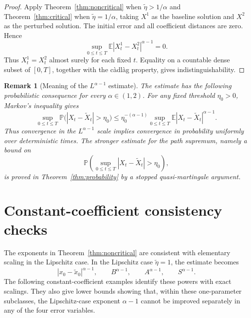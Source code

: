 \documentclass[10pt,a4paper]{amsart}
\newtheorem{remark}[theorem]{Remark}
\newcommand{\E}{\mathbb{E}}
\newcommand{\1}{\mathbf{1}}
\newcommand{\wt}{\tilde}
\begin{document}
\begin{proof}
Apply Theorem~\ref{thm:noncritical} when $\wt\eta>1/\alpha$ and Theorem~\ref{thm:critical} when $\wt\eta=1/\alpha$, taking $X^1$ as the baseline solution and $X^2$ as the perturbed solution. The initial error and all coefficient distances are zero. Hence
\[
  \sup_{0\le t\le T}\E|X_t^1-X_t^2|^{\alpha-1}=0.
\]
Thus $X_t^1=X_t^2$ almost surely for each fixed $t$. Equality on a countable dense subset of $[0,T]$, together with the c\`adl\`ag property, gives indistinguishability.
\end{proof}

\begin{remark}[Meaning of the $L^{\alpha-1}$ estimate]
The estimate has the following probabilistic consequence for every $\alpha\in(1,2)$. For any fixed threshold $\eta_0>0$, Markov's inequality gives
\[
  \sup_{0\le t\le T}\mathbb P\bigl(|X_t-\wt X_t|>\eta_0\bigr)
  \le \eta_0^{-(\alpha-1)}
  \sup_{0\le t\le T}\E|X_t-\wt X_t|^{\alpha-1}.
\]
Thus convergence in the $L^{\alpha-1}$ scale implies convergence in probability uniformly over deterministic times. The stronger estimate for the path supremum, namely a bound on
\[
  \mathbb P\left(\sup_{0\le t\le T}|X_t-\wt X_t|>\eta_0\right),
\]
is proved in Theorem~\ref{thm:probability} by a stopped quasi-martingale argument.
\end{remark}


\section{Constant-coefficient consistency checks}
\label{sec:consistency}

The exponents in Theorem~\ref{thm:noncritical} are consistent with elementary scaling in the Lipschitz case. In the Lipschitz case $\wt\eta=1$, the estimate becomes
\[
  |x_0-\wt x_0|^{\alpha-1},\qquad
  B^{\alpha-1},\qquad A^{\alpha-1},\qquad S^{\alpha-1}.
\]
The following constant-coefficient examples identify these powers with exact scalings. They also give lower bounds showing that, within these one-parameter subclasses, the Lipschitz-case exponent $\alpha-1$ cannot be improved separately in any of the four error variables.
\end{document}
